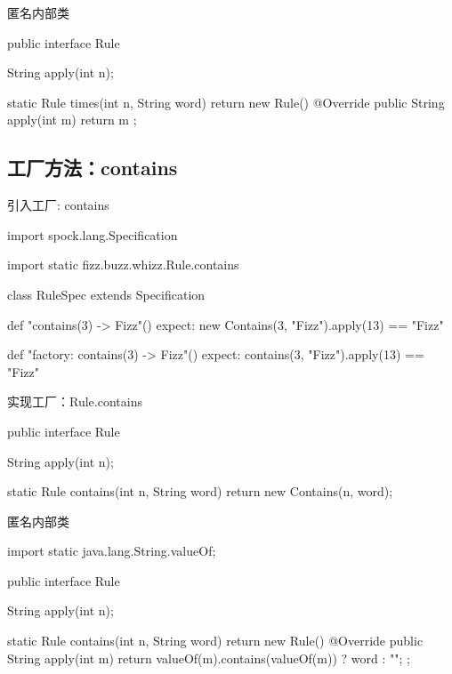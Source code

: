 \begin{frame}[fragile]{匿名内部类}
  \begin{java}
public interface Rule {
  String apply(int n);

  static Rule times(int n, String word) {
    return new Rule() {
      @Override
      public String apply(int m) {
        return m %
      }
    };
  }
}
  \end{java}
\end{frame}

\subsection{工厂方法：contains}

\begin{frame}[fragile]{引入工厂: contains}
  \begin{scala}
import spock.lang.Specification

import static fizz.buzz.whizz.Rule.contains

class RuleSpec extends Specification {
  def "contains(3) -> Fizz"() {
    expect:
    new Contains(3, "Fizz").apply(13) == "Fizz"
  }

  def "factory: contains(3) -> Fizz"() {
    expect:
    contains(3, "Fizz").apply(13) == "Fizz"
  }
}
  \end{scala}
\end{frame}

\begin{frame}[fragile]{实现工厂：Rule.contains}
  \begin{java}
public interface Rule {
  String apply(int n);

  static Rule contains(int n, String word) {
    return new Contains(n, word);
  }
}
  \end{java}
\end{frame}

\begin{frame}[fragile]{匿名内部类}
  \begin{java}
import static java.lang.String.valueOf;

public interface Rule {
  String apply(int n);
  
  static Rule contains(int n, String word) {
    return new Rule() {
      @Override
      public String apply(int m) {
        return valueOf(m).contains(valueOf(m)) ? word : "";
      }
    };
  }
}
  \end{java}
\end{frame}

